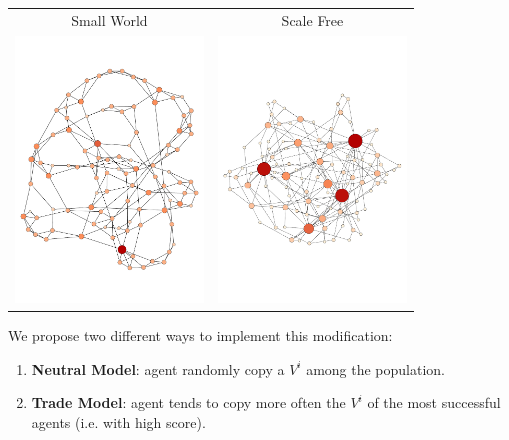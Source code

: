 \documentclass[a1paper,landscape,showframe,fontscale=.42]{baposter}
\newcommand{\compresslist}{
	\setlength{\itemsep}{1pt}
	\setlength{\parskip}{0pt}
	\setlength{\parsep}{0pt}
}
\begin{document}
\begin{poster}
{	\begin{tabular}{ c c}
		 Small World & Scale Free \\
		 \includegraphics[width=5cm]{img/smallworld.pdf}
		 & \includegraphics[width=5cm]{img/scalefree.pdf}

	\end{tabular}


We propose two different ways to implement this modification: 
\vspace{-.15cm}
\begin{enumerate}
		\compresslist
	\item \textbf{Neutral Model}: agent randomly copy a $V^i$ among the population.
	\item \textbf{Trade Model}: agent tends to copy more often the $V^i$ of the most successful agents (i.e. with high score).
\end{enumerate}
}




\end{poster}
\end{document}
